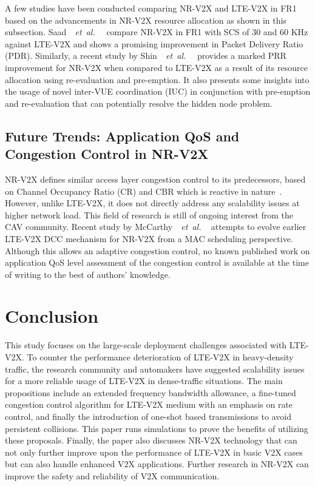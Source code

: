\documentclass[iicol]{sn-jnl}%
\theoremstyle{thmstyleone}%
\theoremstyle{thmstyletwo}%
\theoremstyle{thmstylethree}%
\def\etal{\emph{~et~al. }}
\begin{document}
A few studies have been conducted comparing NR-V2X and LTE-V2X in FR1 based on the advancements in NR-V2X resource allocation as shown in this subsection.
Saad\mbox{~\etal~\cite{saad2021advancements}} compare NR-V2X in FR1 with SCS of 30 and 60 KHz against LTE-V2X and shows a promising improvement in Packet Delivery Ratio (PDR).
Similarly, a recent study by Shin\mbox{~\etal~\cite{shin2023vehicle}} provides a marked PRR improvement for NR-V2X when compared to LTE-V2X as a result of its resource allocation using re-evaluation and pre-emption. It also presents some insights into the usage of novel inter-VUE coordination (IUC) in conjunction with pre-emption and re-evaluation that can potentially resolve the hidden node problem.


\subsection{Future Trends: Application QoS and Congestion Control in NR-V2X}\label{subsec7.3}
NR-V2X defines similar access layer congestion control to its predecessors, based on Channel Occupancy Ratio (CR) and CBR which is reactive in nature~\cite{garcia2021tutorial, bazzi2021design}. However, unlike LTE-V2X, it does not directly address any scalability issues at higher network load. This field of research is still of ongoing interest from the CAV community. Recent study by McCarthy~\etal~\cite{mccarthy2022adapting} attempts to evolve earlier LTE-V2X DCC mechanism for NR-V2X from a MAC scheduling perspective. Although this allows an adaptive congestion control, no known published work on application QoS level assessment of the congestion control is available at the time of writing to the best of authors’ knowledge.


\section{Conclusion}\label{sec8}

This study focuses on the large-scale deployment challenges associated with LTE-V2X. To counter the performance deterioration of LTE-V2X in heavy-density traffic, the research community and automakers have suggested scalability issues for a more reliable usage of LTE-V2X in dense-traffic situations. The main propositions include an extended frequency bandwidth allowance, a fine-tuned congestion control algorithm for LTE-V2X medium with an emphasis on rate control, and finally the introduction of one-shot based transmissions to avoid persistent collisions. This paper runs simulations to prove the benefits of utilizing these proposals. Finally, the paper also discusses NR-V2X technology that can not only further improve upon the performance of LTE-V2X in basic V2X cases but can also handle enhanced V2X applications. Further research in NR-V2X can improve the safety and reliability of V2X communication.
\end{document}
